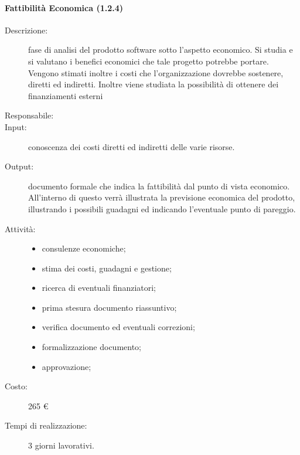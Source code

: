 \paragraph{Fattibilit\`{a} Economica (1.2.4)}
\begin{description}
\item[Descrizione:] fase di analisi del prodotto software sotto l'aspetto economico. Si studia e si valutano i benefici economici che tale progetto potrebbe portare. Vengono stimati inoltre i costi che l'organizzazione dovrebbe sostenere, diretti ed indiretti. Inoltre viene studiata la possibilit\`{a} di ottenere dei finanziamenti esterni 
\item[Responsabile:] 
\item[Input:] conoscenza dei costi diretti ed indiretti delle varie risorse.
\item[Output:] documento formale che indica la fattibilit\`{a} dal punto di vista economico. All'interno di questo verr\`{a} illustrata la previsione economica del prodotto, illustrando i possibili guadagni ed indicando l'eventuale punto di pareggio.
\item[Attivit\`{a}:] 
\begin{center}
\begin{itemize}
\item consulenze economiche;
\item stima dei costi, guadagni e gestione;
\item ricerca di eventuali finanziatori;
\item prima stesura documento riassuntivo;
\item verifica documento ed eventuali correzioni;
\item formalizzazione documento;
\item approvazione;
\end{itemize}
\end{center}
\item[Costo:] 265 \euro{}
\item[Tempi di realizzazione:] 3 giorni lavorativi.
\end{description}

